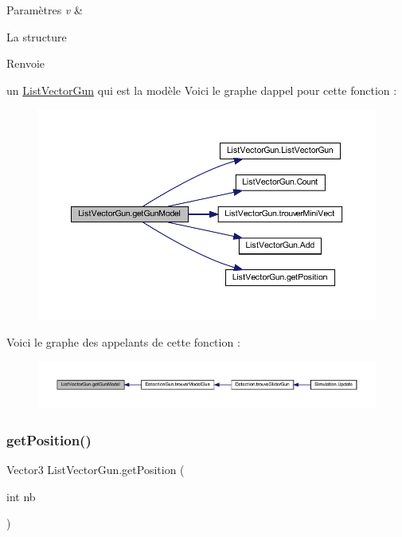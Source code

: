 \begin{DoxyParams}{Paramètres}
{\em v} & \\
\hline
\end{DoxyParams}
La structure \begin{DoxyReturn}{Renvoie}

\end{DoxyReturn}
un \mbox{\hyperlink{class_list_vector_gun}{List\+Vector\+Gun}} qui est la modèle Voici le graphe d\textquotesingle{}appel pour cette fonction \+:
\nopagebreak
\begin{figure}[H]
\begin{center}
\leavevmode
\includegraphics[width=350pt]{class_list_vector_gun_ad93bd26e0c5d5e71ff75acfb43edd5c3_cgraph}
\end{center}
\end{figure}
Voici le graphe des appelants de cette fonction \+:
\nopagebreak
\begin{figure}[H]
\begin{center}
\leavevmode
\includegraphics[width=350pt]{class_list_vector_gun_ad93bd26e0c5d5e71ff75acfb43edd5c3_icgraph}
\end{center}
\end{figure}
\mbox{\label{class_list_vector_gun_a6b94b7d8288d1415f1670181251bbfa2}} 
\subsubsection{\texorpdfstring{get\+Position()}{getPosition()}}
{\footnotesize\ttfamily Vector3 List\+Vector\+Gun.\+get\+Position (\begin{DoxyParamCaption}\item[{int}]{nb }\end{DoxyParamCaption})\hspace{0.3cm}{\ttfamily [inline]}}






